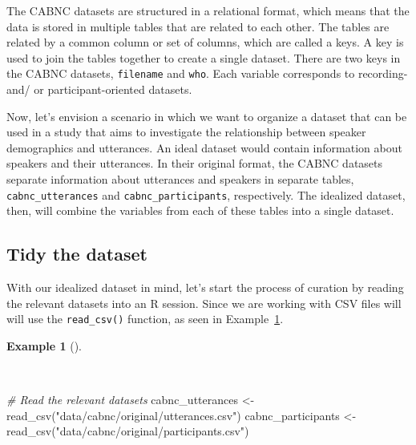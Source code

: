 \documentclass[
  letterpaper,
  DIV=11,
  numbers=noendperiod]{scrreport}
\newenvironment{Shaded}{\begin{snugshade}}{\end{snugshade}}
\newcommand{\CommentTok}[1]{\textcolor[rgb]{0.00,0.00,0.00}{\textit{#1}}}
\newcommand{\FunctionTok}[1]{\textcolor[rgb]{0.00,0.00,0.00}{#1}}
\newcommand{\NormalTok}[1]{\textcolor[rgb]{0.00,0.00,0.00}{#1}}
\newcommand{\OtherTok}[1]{\textcolor[rgb]{0.00,0.00,0.00}{#1}}
\newcommand{\StringTok}[1]{\textcolor[rgb]{0.00,0.00,0.00}{#1}}
\theoremstyle{definition}
\newtheorem{example}{Example}[chapter]
\theoremstyle{remark}
\begin{document}
The CABNC datasets are structured in a relational format, which means
that the data is stored in multiple tables that are related to each
other. The tables are related by a common column or set of columns,
which are called a keys. A key is used to join the tables together to
create a single dataset. There are two keys in the CABNC datasets,
\texttt{filename} and \texttt{who}. Each variable corresponds to
recording- and/ or participant-oriented datasets.

Now, let's envision a scenario in which we want to organize a dataset
that can be used in a study that aims to investigate the relationship
between speaker demographics and utterances. An ideal dataset would
contain information about speakers and their utterances. In their
original format, the CABNC datasets separate information about
utterances and speakers in separate tables, \texttt{cabnc\_utterances}
and \texttt{cabnc\_participants}, respectively. The idealized dataset,
then, will combine the variables from each of these tables into a single
dataset.

\hypertarget{tidy-the-dataset}{%
\subsection{Tidy the dataset}\label{tidy-the-dataset}}

With our idealized dataset in mind, let's start the process of curation
by reading the relevant datasets into an R session. Since we are working
with CSV files will will use the \texttt{read\_csv()} function, as seen
in Example~\ref{exm-cd-cabnc-read}.

\begin{example}[]\protect\hypertarget{exm-cd-cabnc-read}{}\label{exm-cd-cabnc-read}

~

\begin{Shaded}
\begin{Highlighting}[]
\CommentTok{\# Read the relevant datasets}
\NormalTok{cabnc\_utterances }\OtherTok{\textless{}{-}} 
  \FunctionTok{read\_csv}\NormalTok{(}\StringTok{"data/cabnc/original/utterances.csv"}\NormalTok{)}
\NormalTok{cabnc\_participants }\OtherTok{\textless{}{-}} 
  \FunctionTok{read\_csv}\NormalTok{(}\StringTok{"data/cabnc/original/participants.csv"}\NormalTok{)}
\end{Highlighting}
\end{Shaded}

\end{example}
\end{document}
